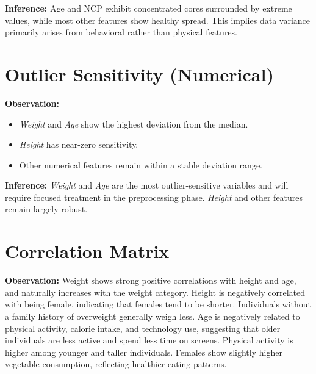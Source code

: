 \textbf{Inference:}
Age and NCP exhibit concentrated cores surrounded by extreme values, while most other features show healthy spread.
This implies data variance primarily arises from behavioral rather than physical features.



\section{Outlier Sensitivity (Numerical)}\label{sec:outlier-sensitivity-(numerical)}

\textbf{Observation:}
\begin{itemize}
    \item \textit{Weight} and \textit{Age} show the highest deviation from the median.
    \item \textit{Height} has near-zero sensitivity.
    \item Other numerical features remain within a stable deviation range.
\end{itemize}

\textbf{Inference:}
\textit{Weight} and \textit{Age} are the most outlier-sensitive variables and will require focused treatment in the preprocessing phase.
\textit{Height} and other features remain largely robust.



\section{Correlation Matrix}\label{sec:correlation-matrix}

\textbf{Observation:} Weight shows strong positive correlations with height and age, and naturally increases with the weight category.
Height is negatively correlated with being female, indicating that females tend to be shorter.
Individuals without a family history of overweight generally weigh less.
Age is negatively related to physical activity, calorie intake, and technology use, suggesting that older individuals are less active and spend less time on screens.
Physical activity is higher among younger and taller individuals.
Females show slightly higher vegetable consumption, reflecting healthier eating patterns.

